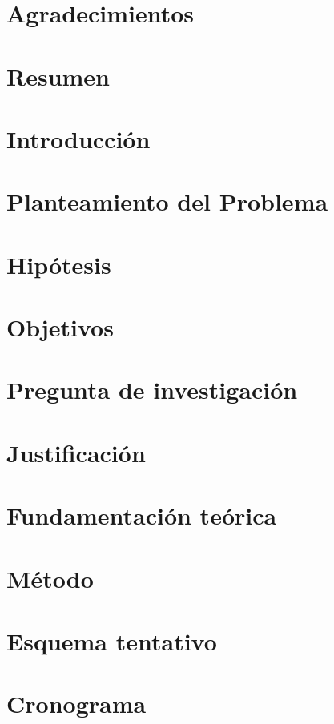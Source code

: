 \documentclass{book}
\begin{document}
\frontmatter

\pagestyle{empty}	

\chapter*{Agradecimientos}
\chapter*{Resumen}

\tableofcontents
\listoffigures
\listoftables
\mainmatter

\chapter{Introducción}
	

\chapter{Planteamiento del Problema}
	
	
\chapter{Hipótesis}
	

\chapter{Objetivos}
	
	
\chapter{Pregunta de investigación}
	
	
\chapter{Justificación}
	
	
\chapter{Fundamentación teórica}
	

\chapter{Método}
	

\backmatter




\chapter{Esquema tentativo}
	

\chapter{Cronograma}
	
\end{document}
